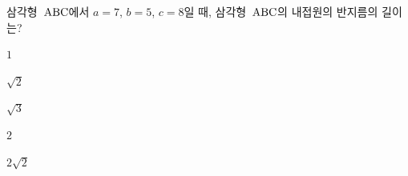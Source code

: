 삼각형~$\mathrm{ABC}$에서 $a=7$, $b=5$, $c=8$일 때, 삼각형~$\mathrm{ABC}$의 내접원의 반지름의 길이는?
\begin{choices32}{\rule[-3ex]{0pt}{8ex}$1$}{\rule[-3ex]{0pt}{8ex}$\sqrt{2}$}{\rule[-3ex]{0pt}{8ex}$\sqrt{3}$}{\rule[-3ex]{0pt}{8ex}$2$}{\rule[-3ex]{0pt}{8ex}$2\sqrt{2}$}\end{choices32}

